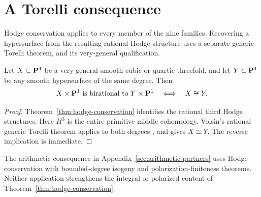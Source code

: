 \section{A Torelli consequence}
\label{sec:torelli}
Hodge conservation applies to every member of the nine families.
Recovering a hypersurface from the resulting rational Hodge structure uses
a separate generic Torelli theorem, and its very-general qualification.

\begin{corollary}
\label{cor:generic-cancellation}%
Let $X\subset\mathbf P^4$ be a very general smooth cubic or quartic threefold,
and let $Y\subset\mathbf P^4$ be any smooth hypersurface of the same degree.
Then
\[
 X\times\mathbf P^1\text{ is birational to }Y\times\mathbf P^1
 \quad\Longleftrightarrow\quad X\cong Y.
\]
\end{corollary}
\begin{proof}
Theorem~\ref{thm:hodge-conservation} identifies the rational third Hodge
structures. Here $H^3$ is the entire primitive middle cohomology.
Voisin's rational generic Torelli theorem applies to both degrees
\cite[Theorem~0.2 and Remarks~0.1, 0.3]{VoisinTorelli}, and gives $X\cong Y$.
The reverse implication is immediate.
%
%
\end{proof}

The arithmetic consequence in Appendix~\ref{sec:arithmetic-partners} uses
Hodge conservation with bounded-degree isogeny and polarization-finiteness
theorems. Neither application strengthens the integral or polarized content
of Theorem~\ref{thm:hodge-conservation}.
